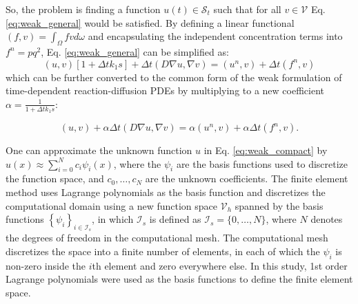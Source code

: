 

So, the problem is finding a function $u(t) \in \mathcal{S}_{t}$ such that for all $v \in \mathcal{V}$ Eq. \ref{eq:weak_general} would be satisfied. By defining a linear functional $(f, v) =\int_{\Omega} f v d \omega$ and encapsulating the independent concentration terms into $f^{n} = pq^2$, Eq. \ref{eq:weak_general} can be simplified as:
\begin{equation}
(u, v)[1+\Delta t k_1 s]+\Delta t(D \nabla u, \nabla v)=\left(u^{n}, v\right)+\Delta t\left(f^{n}, v\right)
\end{equation}
\noindent which can be further converted to the common form of the weak formulation of time-dependent reaction-diffusion {PDE}s by multiplying to a new coefficient $\alpha = \frac{1}{1+\Delta t k_1 s}$:

\begin{equation} \label{eq:weak_compact}
(u, v)+ \alpha \Delta t(D \nabla u, \nabla v)=\alpha \left(u^{n}, v\right)+ \alpha \Delta t\left(f^{n}, v\right).
\end{equation}

One can approximate the unknown function $u$ in Eq. \ref{eq:weak_compact} by $u(x) \approx \sum_{i=0}^{N} c_{i} \psi_{i}(x)$, where the $\psi_{i}$ are the basis functions used to discretize the function space, and $c_0,\ldots,c_N$ are the unknown coefficients. The finite element method uses Lagrange polynomials as the basis function and discretizes the computational domain using a new function space $\mathcal{V}_h$ spanned by the basis functions $\left\{\psi_{i}\right\}_{i \in \mathcal{I}_{s}}$, in which $\mathcal{I}_{s}$ is defined as $\mathcal{I}_{s}=\{0, \ldots, N\}$, where $N$ denotes the degrees of freedom in the computational mesh. The computational mesh discretizes the space into a finite number of elements, in each of which the $\psi_{i}$ is non-zero inside the $i$th element and zero everywhere else. In this study, 1st order Lagrange polynomials were used as the basis functions to define the finite element space.

